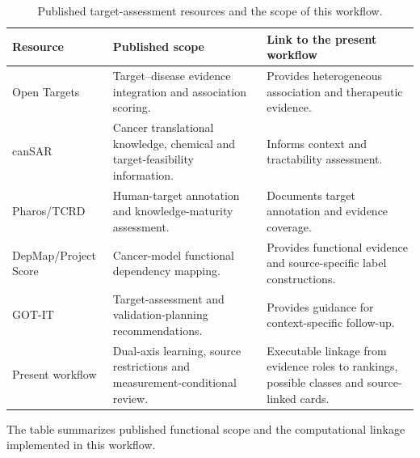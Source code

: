 \begin{table}[!tbp]
\centering\small
\caption{Published target-assessment resources and the scope of this workflow.}\label{tab:framework-comparison}
\begin{tabularx}{\textwidth}{p{}YY}\toprule
Resource & Published scope & Link to the present workflow \\ \midrule
Open Targets \citep{10.1093/nar/gkae1128} & Target--disease evidence integration and association scoring. & Provides heterogeneous association and therapeutic evidence. \\
canSAR \citep{10.1093/nar/gkaa1059} & Cancer translational knowledge, chemical and target-feasibility information. & Informs context and tractability assessment. \\
Pharos/TCRD \citep{10.1093/nar/gkac1033} & Human-target annotation and knowledge-maturity assessment. & Documents target annotation and evidence coverage. \\
DepMap/Project Score \citep{pacini_comprehensive_2024} & Cancer-model functional dependency mapping. & Provides functional evidence and source-specific label constructions. \\
GOT-IT \citep{emmerich_improving_2021} & Target-assessment and validation-planning recommendations. & Provides guidance for context-specific follow-up. \\
Present workflow & Dual-axis learning, source restrictions and measurement-conditional review. & Executable linkage from evidence roles to rankings, possible classes and source-linked cards. \\
\bottomrule\end{tabularx}
\parbox{\textwidth}{\footnotesize The table summarizes published functional scope and the computational linkage implemented in this workflow.}
\end{table}
